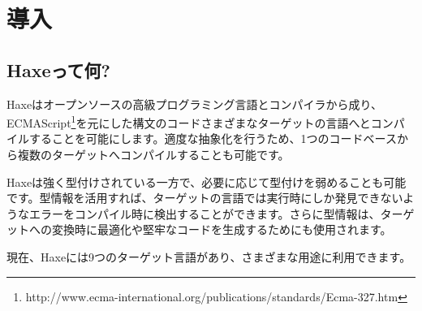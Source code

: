 \chapter{導入}
\label{introduction}

\section{Haxeって何?}
\label{introduction-what-is-haxe}


Haxeはオープンソースの高級プログラミング言語とコンパイラから成り、ECMAScript\footnote{http://www.ecma-international.org/publications/standards/Ecma-327.htm}を元にした構文のコードさまざまなターゲットの言語へとコンパイルすることを可能にします。適度な抽象化を行うため、1つのコードベースから複数のターゲットへコンパイルすることも可能です。

Haxeは強く型付けされている一方で、必要に応じて型付けを弱めることも可能です。型情報を活用すれば、ターゲットの言語では実行時にしか発見できないようなエラーをコンパイル時に検出することができます。さらに型情報は、ターゲットへの変換時に最適化や堅牢なコードを生成するためにも使用されます。

現在、Haxeには9つのターゲット言語があり、さまざまな用途に利用できます。

